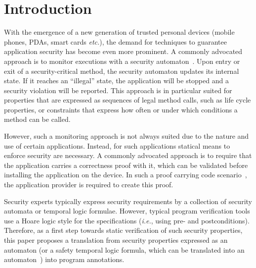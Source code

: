 \section{Introduction}\label{SecIntro}

With the emergence of a new generation of trusted personal devices
(mobile phones, PDAs, smart cards \emph{etc.}), the demand for
techniques to guarantee application security has become even more
prominent. A commonly advocated approach is to monitor
executions with a security automaton~\cite{Schneider99}. Upon entry
or exit of a security-critical method, the security automaton updates
its internal state. If it reaches an ``illegal'' state, the
application will be stopped and a security violation will be
reported. This approach is in particular suited for properties that
are expressed as sequences of legal method calls, such as life cycle
properties, or constraints that express how often or under which
conditions a method can be called.

However, such a monitoring approach is not always suited due to the
nature and use of certain applications.
Instead, for such applications
statical means to enforce security are necessary. A commonly advocated
approach is to require that the application carries a correctness
proof with it, which can be validated before installing the application
on the device. In such a proof carrying code scenario~\cite{Necula97},
the application provider is required to create this proof.

Security experts typically express security requirements by a collection of
security automata or temporal logic formulae. However, typical program
verification tools %
use a Hoare logic style for the specifications (\emph{i.e.}, using pre- and
postconditions). Therefore, as a first step towards static
verification of such security properties, this paper proposes a
translation from security properties expressed as an automaton (or a
safety temporal logic formula, which can be translated into an
automaton~\cite{Wolper01}) into program annotations.

